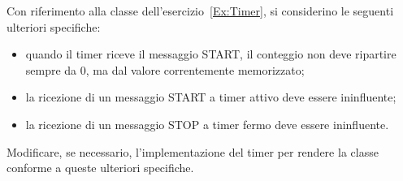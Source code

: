 Con riferimento alla classe  dell'esercizio~\ref{Ex:Timer}, si considerino le seguenti ulteriori specifiche:

\begin{itemize}
\item quando il timer riceve il messaggio START, il conteggio non deve ripartire sempre da 0, ma dal valore correntemente memorizzato;
\item la ricezione di un messaggio START a timer attivo deve essere ininfluente;
\item la ricezione di un messaggio STOP a timer fermo deve essere ininfluente.
\end{itemize}

Modificare, se necessario, l'implementazione del timer per rendere la classe conforme a queste ulteriori specifiche.